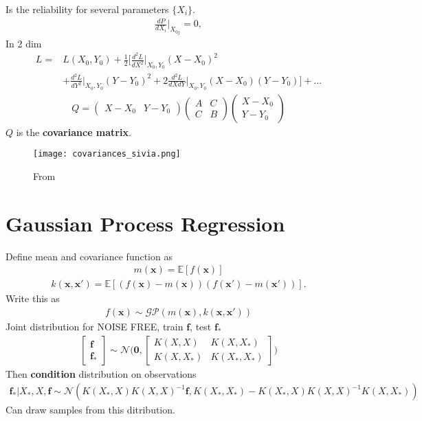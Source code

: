\documentclass[twoside,english]{uiofysmaster}
\begin{document}
Is the reliability for several parameters $\{ X_i \}$. 
\begin{align}
\frac{dP}{dX_i} \Big|_{X_{0j}} =0,
\end{align}
In 2 dim
\begin{align}
L =& L(X_0, Y_0) + \frac{1}{2} \Big[ \frac{d^2L}{dX^2}  \Big|_{X_0, Y_0}(X-X_0)^2\\
& + \frac{d^2L}{dY^2}  \Big|_{X_0, Y_0}(Y-Y_0)^2 + 2 \frac{d^2L}{dXdY}  \Big|_{X_0, Y_0}(X-X_0)(Y-Y_0) \Big] +...
\end{align}
\begin{align}
Q = 
\begin{pmatrix}
X-X_0 & Y -Y_0
\end{pmatrix}
\begin{pmatrix}
A & C\\
C & B
\end{pmatrix}
\begin{pmatrix}
X -X_0\\
Y-Y_0
\end{pmatrix}
\end{align}
$Q$ is the \textbf{covariance matrix}.

\begin{figure}
\centering
\texttt{[image: covariances\_sivia.png]}
\caption{From \cite{sivia2006data}}
\end{figure}


\section{Gaussian Process Regression}

Define mean and covariance function as
\begin{align}
m(\textbf{x}) = \mathbb{E}[f(\textbf{x})]
\end{align}
\begin{align}
k(\textbf{x}, \textbf{x}') = \mathbb{E} [(f(\textbf{x}) - m(\textbf{x}))(f(\textbf{x}') - m(\textbf{x}'))].
\end{align}
Write this as 
\begin{align}
f(\textbf{x}) \sim \mathcal{GP}(m(\textbf{x}), k(\textbf{x}, \textbf{x}'))
\end{align}
Joint distribution for NOISE FREE, train $\textbf{f}$, test $\textbf{f}_*$
\begin{align}
\begin{bmatrix}
\textbf{f}\\
\textbf{f}_*
\end{bmatrix}
\sim 
\mathcal{N} \Bigg(
\boldsymbol{0},
\begin{bmatrix}
K(X, X) & K(X, X_*)\\
K(X, X_*) & K(X_*, X_*)
\end{bmatrix}
 \Bigg)
\end{align}
Then \textbf{condition} distribution on observations
\begin{align}
\textbf{f}_* \big| X_*, X, \textbf{f} \sim \mathcal{N}(K(X_*, X)K(X, X)^{-1} \textbf{f}, K(X_*, X_*) - K(X_*, X)K(X, X)^{-1}K(X, X_*))
\end{align}
Can draw samples from this ditribution.
\end{document}
